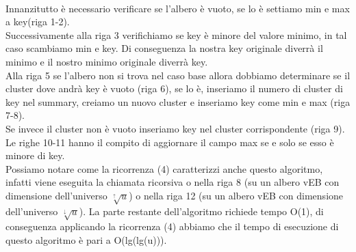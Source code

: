 \documentclass{article}
\begin{document}
\begin{flushleft}
                
                
            ~\\Innanzitutto è necessario verificare se l'albero è vuoto, se lo è settiamo min e max a key(riga 1-2).\\
            Successivamente alla riga 3 verifichiamo se key è minore del valore minimo, in tal caso scambiamo min e key. Di conseguenza la nostra key originale diverrà il minimo e il nostro minimo originale diverrà key.\\
            Alla riga 5 se l'albero non si trova nel caso base allora dobbiamo determinare se il cluster dove andrà key è vuoto (riga 6), se lo è, inseriamo il numero di cluster di key nel summary, creiamo un nuovo cluster e inseriamo key come min e max (riga 7-8).\\
            Se invece il cluster non è vuoto inseriamo key nel cluster corrispondente (riga 9).\\
            Le righe 10-11 hanno il compito di aggiornare il campo max se e solo se esso è minore di key.\\
            Possiamo notare come la ricorrenza (4) caratterizzi anche questo algoritmo, infatti viene eseguita la chiamata ricorsiva o nella riga 8 (su un albero vEB con dimensione dell'universo $\sqrt[\uparrow]{u}$) o nella riga 12 (su un albero vEB con dimensione dell'universo $\sqrt[\downarrow]{u}$). La parte restante dell'algoritmo richiede tempo O(1), di conseguenza applicando la ricorrenza (4) abbiamo che il tempo di esecuzione di questo algoritmo è pari a O(lg(lg(u))).
            
\end{flushleft}        
\end{document}
